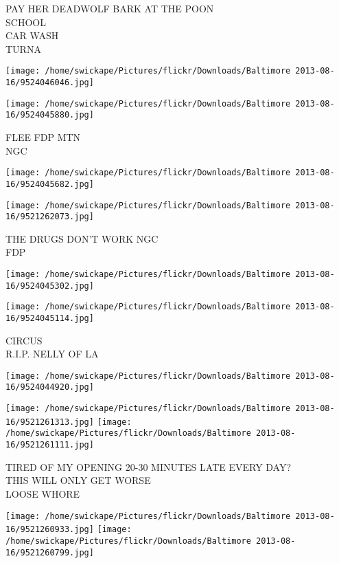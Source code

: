 \documentclass[10pt,letterpaper]{article}
\begin{document}
PAY HER DEADWOLF BARK AT THE POON\\
SCHOOL\\
CAR WASH\\
TURNA
\pagebreak

\texttt{[image: /home/swickape/Pictures/flickr/Downloads/Baltimore 2013-08-16/9524046046.jpg]}

\vspace{0.25in}
\texttt{[image: /home/swickape/Pictures/flickr/Downloads/Baltimore 2013-08-16/9524045880.jpg]}

FLEE FDP MTN\\
NGC
\pagebreak

\texttt{[image: /home/swickape/Pictures/flickr/Downloads/Baltimore 2013-08-16/9524045682.jpg]}

\vspace{0.25in}
\texttt{[image: /home/swickape/Pictures/flickr/Downloads/Baltimore 2013-08-16/9521262073.jpg]}

THE DRUGS DON'T WORK NGC\\
FDP
\pagebreak

\texttt{[image: /home/swickape/Pictures/flickr/Downloads/Baltimore 2013-08-16/9524045302.jpg]}

\vspace{0.25in}
\texttt{[image: /home/swickape/Pictures/flickr/Downloads/Baltimore 2013-08-16/9524045114.jpg]}

CIRCUS\\
R.I.P. NELLY OF LA
\pagebreak

\texttt{[image: /home/swickape/Pictures/flickr/Downloads/Baltimore 2013-08-16/9524044920.jpg]}

\vspace{0.25in}
\texttt{[image: /home/swickape/Pictures/flickr/Downloads/Baltimore 2013-08-16/9521261313.jpg]}
\texttt{[image: /home/swickape/Pictures/flickr/Downloads/Baltimore 2013-08-16/9521261111.jpg]}

TIRED OF MY OPENING 20{-}30 MINUTES LATE EVERY DAY?\\
THIS WILL ONLY GET WORSE\\
LOOSE WHORE
\pagebreak

\texttt{[image: /home/swickape/Pictures/flickr/Downloads/Baltimore 2013-08-16/9521260933.jpg]}
\texttt{[image: /home/swickape/Pictures/flickr/Downloads/Baltimore 2013-08-16/9521260799.jpg]}
\end{document}
